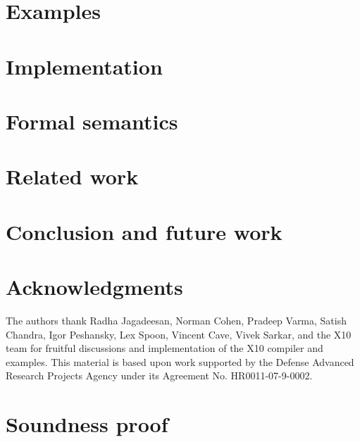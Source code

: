 \documentclass[10pt]{sigplanconf}
\begin{document}
\label{method-sec}


\section{Examples}\label{sec:examples}


\section{Implementation}\label{sec:implementation}
\label{sec:impl}


\section{Formal semantics}
\label{sec:semantics}


\section{Related work}\label{sec:related}


\section{Conclusion and future work}\label{sec:future}\label{sec:conclusions}
%

\fi

\section*{Acknowledgments}

The authors thank Radha Jagadeesan,
Norman Cohen, Pradeep Varma,
Satish Chandra, Igor Peshansky,
Lex Spoon, Vincent Cave, Vivek Sarkar,
and the X10 team for fruitful discussions and implementation of
the X10 compiler and examples.
This material is based upon work supported by the Defense
Advanced Research Projects Agency under its Agreement No.
HR0011-07-9-0002.
\fi





\appendix

\section{Soundness proof}
\label{sec:proof}



% 
\end{document}
